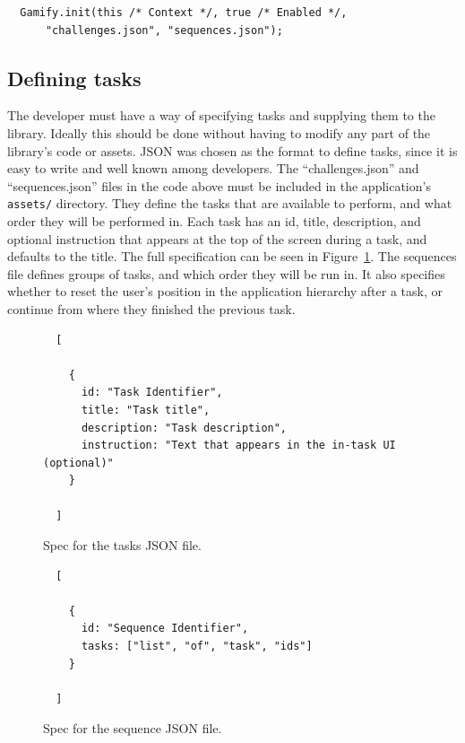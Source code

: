 \begin{verbatim}
  Gamify.init(this /* Context */, true /* Enabled */,
      "challenges.json", "sequences.json");
\end{verbatim}

\subsection{Defining tasks}

The developer must have a way of specifying tasks and supplying
them to the library. Ideally this should be done without having
to modify any part of the library's code or assets. JSON was
chosen as the format to define tasks, since it is easy to write
and well known among developers.
The ``challenges.json'' and ``sequences.json'' files in the code
above must be included in the application's \verb+assets/+ directory.
They define the tasks that are available to perform, and what order
they will be performed in.
Each task has an id, title, description, and optional instruction
that appears at the top of the screen during a task, and defaults
to the title. The full specification can be seen in Figure~\ref{fig:task-spec}.
The sequences file defines groups of tasks, and which
order they will be run in. It also specifies whether to reset the
user's position in the application hierarchy after a task, or
continue from where they finished the previous task.

\begin{figure}[h]
  \begin{verbatim}
  [
  
    {
      id: "Task Identifier", 
      title: "Task title",
      description: "Task description",
      instruction: "Text that appears in the in-task UI (optional)"
    }
    
  ]
  \end{verbatim}
  \label{fig:task-spec}
  \caption{Spec for the tasks JSON file.}
\end{figure}

\begin{figure}[h]
  \begin{verbatim}
  [
  
    {
      id: "Sequence Identifier", 
      tasks: ["list", "of", "task", "ids"]
    }
    
  ]
  \end{verbatim}
  \label{fig:sequence-spec}
  \caption{Spec for the sequence JSON file.}
\end{figure}

